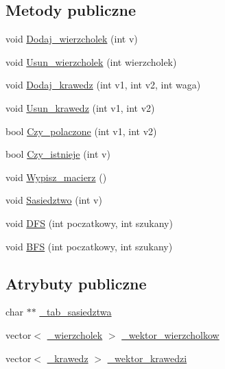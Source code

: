 \subsection*{\-Metody publiczne}
\begin{DoxyCompactItemize}
\item 
void \hyperlink{class_graf_a1d04219ee7346afb627353c9d57b8cb2}{\-Dodaj\-\_\-wierzcholek} (int v)
\item 
void \hyperlink{class_graf_ad1091bfe67b16460cd64aebdcbb5b521}{\-Usun\-\_\-wierzcholek} (int wierzcholek)
\item 
void \hyperlink{class_graf_ae12b5623e92fa86ff51d51db1804e793}{\-Dodaj\-\_\-krawedz} (int v1, int v2, int waga)
\item 
void \hyperlink{class_graf_af2ca22dd1730ce9067e484cf21db5b3f}{\-Usun\-\_\-krawedz} (int v1, int v2)
\item 
bool \hyperlink{class_graf_affe4be381a025ca350ccc86ff68ea9d1}{\-Czy\-\_\-polaczone} (int v1, int v2)
\item 
bool \hyperlink{class_graf_a922eadf981e7dcd36bdbbdac102ee8e7}{\-Czy\-\_\-istnieje} (int v)
\item 
void \hyperlink{class_graf_a284d7f2e4bab1832220ce41fdef5d024}{\-Wypisz\-\_\-macierz} ()
\item 
void \hyperlink{class_graf_afc14626d6712964761d749568b0ec5af}{\-Sasiedztwo} (int v)
\item 
void \hyperlink{class_graf_a92a75c629930662bb43b72f0d44f8c63}{\-D\-F\-S} (int poczatkowy, int szukany)
\item 
void \hyperlink{class_graf_aa101a5b533a42b4d9c447e8891920fe9}{\-B\-F\-S} (int poczatkowy, int szukany)
\end{DoxyCompactItemize}
\subsection*{\-Atrybuty publiczne}
\begin{DoxyCompactItemize}
\item 
char $\ast$$\ast$ \hyperlink{class_graf_a55dab6e3ffdfbddf0b90cfb2c3eb8a12}{\-\_\-tab\-\_\-sasiedztwa}
\item 
vector$<$ \hyperlink{struct_graf_1_1__wierzcholek}{\-\_\-wierzcholek} $>$ \hyperlink{class_graf_a6156d0fd54662028922b4134a92cb357}{\-\_\-wektor\-\_\-wierzcholkow}
\item 
vector$<$ \hyperlink{struct_graf_1_1__krawedz}{\-\_\-krawedz} $>$ \hyperlink{class_graf_a79c79b147cde2bb403d3aa27db8f9f22}{\-\_\-wektor\-\_\-krawedzi}
\end{DoxyCompactItemize}


